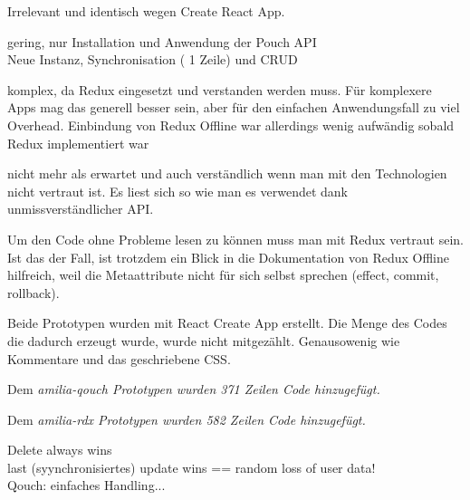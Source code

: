 
Irrelevant und identisch wegen Create React App.

%
\begin{description}[leftmargin=0.5cm,style=nextline]
  \item[amilia-qouch]
  gering, nur Installation und Anwendung der Pouch API\\
  Neue Instanz, Synchronisation ( 1 Zeile) und CRUD
  \item[amilia-rdx]
  komplex, da Redux eingesetzt und verstanden werden muss. Für komplexere Apps mag das generell besser sein, aber für den einfachen Anwendungsfall zu viel Overhead. Einbindung von Redux Offline war allerdings wenig aufwändig sobald Redux implementiert war
\end{description}
%
\begin{description}[leftmargin=0.5cm,style=nextline]
  \item[amilia-qouch]
  nicht mehr als erwartet und auch verständlich wenn man mit den Technologien nicht vertraut ist. Es liest sich so wie man es verwendet dank unmissverständlicher API.
  \item[amilia-rdx] 
  Um den Code ohne Probleme lesen zu können muss man mit Redux vertraut sein. Ist das der Fall, ist trotzdem ein Blick in die Dokumentation von Redux Offline hilfreich, weil die Metaattribute nicht für sich selbst sprechen (effect, commit, rollback).
\end{description}
%
  Beide Prototypen wurden mit React Create App erstellt. Die Menge des Codes die dadurch erzeugt wurde, wurde nicht mitgezählt. Genausowenig wie Kommentare und das geschriebene \gls{CSS}.
  \begin{description}[leftmargin=0.5cm,style=nextline]
    \item[amilia-qouch]
    Dem \it{amilia-qouch} Prototypen wurden 371 Zeilen Code hinzugefügt.
    \item[amilia-rdx] 
    Dem \it{amilia-rdx} Prototypen wurden 582 Zeilen Code hinzugefügt.
\end{description}
%
Delete always wins\\
last (syynchronisiertes) update wins == random loss of user data!\\
Qouch: einfaches Handling...